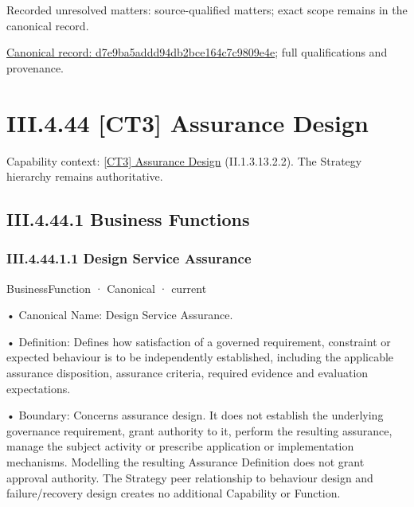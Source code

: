 {\small Recorded unresolved matters: source-qualified matters; exact scope remains in the canonical record.}\par
{\footnotesize \href{../../../../continuum/business/business-function/d7e9ba5addd94db2bce164c7c9809e4e.md}{Canonical record: d7e9ba5addd94db2bce164c7c9809e4e}; full qualifications and provenance.}\par
\section*{III.4.44 [CT3] Assurance Design}
\label{navigation:III.4.44}

{\small Capability context: \hyperref[element:71c8a612b88f4ecba049e94d506bd0c2]{[CT3] Assurance Design} (II.1.3.13.2.2). The Strategy hierarchy remains authoritative.}\par
\subsection*{III.4.44.1 Business Functions}
\label{navigation:III.4.44.1}

\subsubsection*{III.4.44.1.1 Design Service Assurance}
\label{navigation:III.4.44.1.1}

\label{element:6668aa8daf964fec93fce42d48b37ad1}
{\small BusinessFunction · Canonical · current}\par

•
Canonical Name: Design Service Assurance.



•
Definition: Defines how satisfaction of a governed requirement, constraint or expected behaviour is to be independently established, including the applicable assurance disposition, assurance criteria, required evidence and evaluation expectations.



•
Boundary: Concerns assurance design. It does not establish the underlying governance requirement, grant authority to it, perform the resulting assurance, manage the subject activity or prescribe application or implementation mechanisms. Modelling the resulting Assurance Definition does not grant approval authority. The Strategy peer relationship to behaviour design and failure/recovery design creates no additional Capability or Function.




